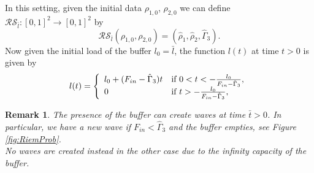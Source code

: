 \documentclass[12pt,subeqn]{article}
\numberwithin{equation}{section}
\newtheorem{remark}{Remark}
\newcommand{\Riem}{\mathcal{RS}}
\newcommand{\Rieml}{\Riem_{\bar{l}}}
\begin{document}
In this setting, given the initial data $\rho_{1,0}$, $\rho_{2,0}$ we can define $\Rieml:[0,1]^2\rightarrow[0,1]^2$ by 
\begin{equation}
	\label{eq:Rieml}
	\Rieml(\rho_{1,0},\rho_{2,0})=(\hat{\rho}_1 ,\hat{\rho}_2 , \hat{\Gamma}_3 ).
\end{equation}
Now given the initial load of the buffer $l_0=\bar{l}$, the function $l(t)$ at time $t>0$ is given by
\begin{equation}
	\label{eq:solODE}
	l(t)=\left\{
			 \begin{array}{ll}
			 l_0 + (F_{in} - \hat{\Gamma}_3)t &\hbox{if}~ 0 < t < -\frac{l_0}{F_{in} - \hat{\Gamma}_3},\\ 
			 0 &\hbox{if}~t > -\frac{l_0}{F_{in} - \hat{\Gamma}_3},
			 \end{array}
			 \right.
\end{equation}
\begin{remark}
The presence of the buffer can create waves at time $\bar{t} > 0$. In particular, we have a new wave if $F_{in} < \hat{\Gamma}_3$ and the buffer empties, see Figure  \ref{fig:RiemProb}. \\
No waves are created instead in the other case due to the infinity capacity of the buffer.
\end{remark}
\end{document}
